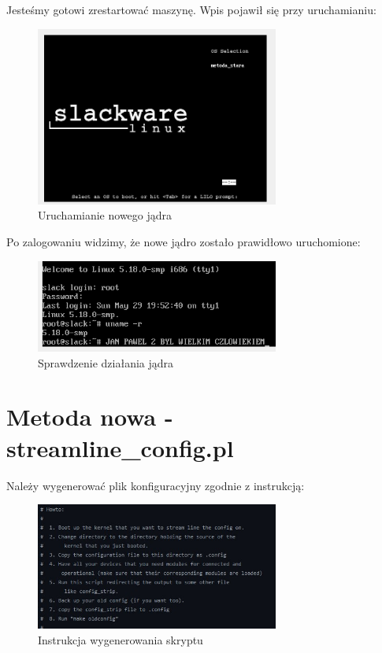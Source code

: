 \documentclass[12pt]{article}
\begin{document}
Jesteśmy gotowi zrestartować maszynę. Wpis pojawił się przy uruchamianiu:

\begin{figure}[H]
\centering
\includegraphics[width=8cm]{uruchamianielionuxa.jpg}
\caption{Uruchamianie nowego jądra}
\end{figure}

Po zalogowaniu widzimy, że nowe jądro zostało prawidłowo uruchomione:

\begin{figure}[H]
\centering
\includegraphics[width=8cm]{sprawdzeniedzialaniametodastara.png}
\caption{Sprawdzenie działania jądra}
\end{figure}

\section{Metoda nowa - streamline\_config.pl}

Należy wygenerować plik konfiguracyjny zgodnie z instrukcją:

\begin{figure}[H]
\centering
\includegraphics[width=8cm]{instrukcja.jpg}
\caption{Instrukcja wygenerowania skryptu}
\end{figure}
\end{document}

